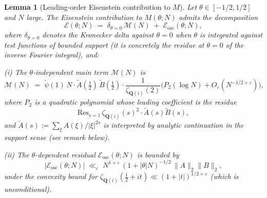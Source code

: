 \documentclass[11pt]{article}
\newtheorem{lemma}[theorem]{Lemma}
\theoremstyle{definition}
\newcommand{\Q}{\mathbf{Q}}
\begin{document}
\begin{lemma}[Leading-order Eisenstein contribution to $M$]\label{lem:eisenstein-main}
Let $\theta \in [-1/2,1/2]$ and $N$ large. The Eisenstein contribution to $M(\theta;N)$ admits the decomposition
\begin{equation}\label{eq:E-main}
    \mathcal{E}(\theta;N) \;=\; \delta_{\theta=0}\, \mathcal{M}(N) \;+\; \mathcal{E}_{\mathrm{osc}}(\theta;N),
\end{equation}
where $\delta_{\theta=0}$ denotes the Kronecker delta against $\theta=0$ \emph{when $\theta$ is integrated against test functions of bounded support} (it is concretely the residue at $\theta=0$ of the inverse Fourier integral), and:

(i) The $\theta$-independent main term $\mathcal{M}(N)$ is
\begin{equation}\label{eq:M-main}
    \mathcal{M}(N) \;=\; \widetilde\psi(1)\, N \cdot \widetilde A(\tfrac{1}{2})\,\widetilde B(\tfrac{1}{2}) \cdot \frac{1}{\zeta_{\Q(i)}(2)}\bigl(P_2(\log N) + O_\varepsilon(N^{-1/2+\varepsilon})\bigr),
\end{equation}
where $P_2$ is a quadratic polynomial whose leading coefficient is the residue
\[
    \mathrm{Res}_{s=1}\, \zeta_{\Q(i)}(s)^2 \cdot \widetilde A(s)\widetilde B(s),
\]
and $\widetilde A(s) := \sum_\xi A(\xi)/|\xi|^{2s}$ is interpreted by analytic continuation in the support sense (see remark below).

(ii) The $\theta$-dependent residual $\mathcal{E}_{\mathrm{osc}}(\theta;N)$ is bounded by
\begin{equation}\label{eq:E-osc-bound}
    |\mathcal{E}_{\mathrm{osc}}(\theta;N)| \;\ll_\varepsilon\; N^{1+\varepsilon}\,(1+|\theta| N)^{-1/2}\,\|A\|_2\|B\|_2,
\end{equation}
under the convexity bound for $\zeta_{\Q(i)}(\tfrac{1}{2}+it) \ll (1+|t|)^{1/2+\varepsilon}$ (which is unconditional).
\end{lemma}
\end{document}
